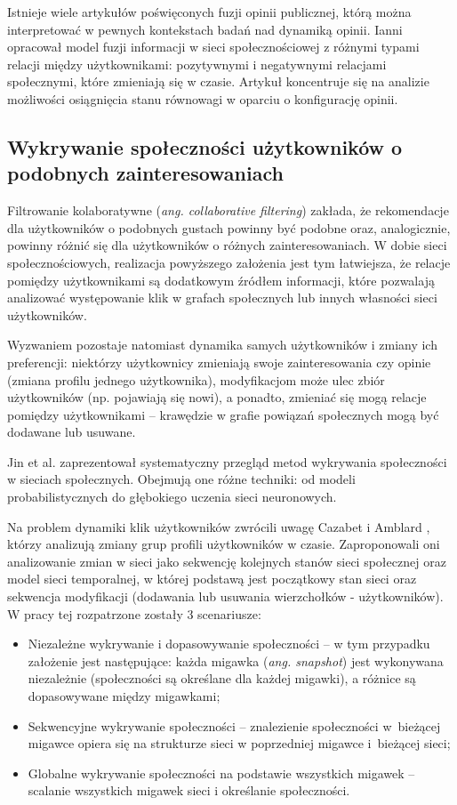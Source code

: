 Istnieje wiele artykułów poświęconych fuzji opinii publicznej, którą można interpretować w pewnych kontekstach badań nad dynamiką opinii. Ianni \cite{ianni} opracował model fuzji informacji w sieci społecznościowej z różnymi typami relacji między użytkownikami: pozytywnymi i negatywnymi relacjami społecznymi, które zmieniają się w czasie. Artykuł koncentruje się na analizie możliwości osiągnięcia stanu równowagi w oparciu o konfigurację opinii.


\subsection{Wykrywanie społeczności użytkowników o podobnych zainteresowaniach}

Filtrowanie kolaboratywne (\textit{ang. collaborative filtering}) zakłada, że rekomendacje dla użytkowników o podobnych gustach powinny być podobne oraz, analogicznie, powinny różnić się dla użytkowników o różnych zainteresowaniach. W dobie sieci społecznościowych, realizacja powyższego założenia jest tym łatwiejsza, że relacje pomiędzy użytkownikami są dodatkowym źródłem informacji, które pozwalają analizować występowanie klik w grafach społecznych lub innych własności sieci użytkowników.

Wyzwaniem pozostaje natomiast dynamika samych użytkowników i zmiany ich preferencji: niektórzy użytkownicy zmieniają swoje zainteresowania czy opinie (zmiana profilu jednego użytkownika), modyfikacjom może ulec zbiór użytkowników (np. pojawiają się nowi), a ponadto, zmieniać się mogą relacje pomiędzy użytkownikami -- krawędzie w grafie powiązań społecznych mogą być dodawane lub usuwane.

Jin et al. \cite{jin} zaprezentował systematyczny przegląd metod wykrywania społeczności w sieciach społecznych. Obejmują one różne techniki: od modeli probabilistycznych do głębokiego uczenia sieci neuronowych.

Na problem dynamiki klik użytkowników zwrócili uwagę Cazabet i Amblard \cite{cazabet}, którzy analizują zmiany grup profili użytkowników w czasie. Zaproponowali oni analizowanie zmian w sieci jako sekwencję kolejnych stanów sieci społecznej oraz model sieci temporalnej, w której podstawą jest początkowy stan sieci oraz sekwencja modyfikacji (dodawania lub usuwania wierzchołków  - użytkowników). W pracy tej rozpatrzone zostały 3 scenariusze:
\begin{itemize}
    \item Niezależne wykrywanie i dopasowywanie społeczności -- w tym przypadku założenie jest następujące: każda migawka (\textit{ang. snapshot}) jest wykonywana niezależnie (społeczności są określane dla każdej migawki), a różnice są dopasowywane między migawkami;
    \item Sekwencyjne wykrywanie społeczności -- znalezienie społeczności w~bieżącej migawce opiera się na strukturze sieci w poprzedniej migawce i~bieżącej sieci;
    \item Globalne wykrywanie społeczności na podstawie wszystkich migawek -- scalanie wszystkich migawek sieci i określanie społeczności.
\end{itemize}

